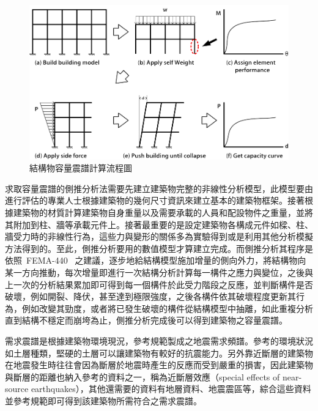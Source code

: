 \begin{figure}[hbtp]
  \begin{center}
    \includegraphics[width=1.0\textwidth]{figures/capacity-curve.png}
    \caption{結構物容量震譜計算流程圖}
    \label{fig:capacity-curve}
  \end{center}
\end{figure}

求取容量震譜的側推分析法需要先建立建築物完整的非線性分析模型，此模型要由進行評估的專業人士根據建築物的幾何尺寸資訊來建立基本的建築物框架。接著根據建築物的材質計算建築物自身重量以及需要承載的人員和配設物件之重量，並將其附加到柱、牆等承載元件上。接著最重要的是設定建築物各構成元件如樑、柱、牆受力時的非線性行為，這些力與變形的關係多為實驗得到或是利用其他分析模擬方法得到的。至此，側推分析要用的數值模型才算建立完成。而側推分析其程序是依照~FEMA-440\cite{fema440}~
之建議，逐步地給結構模型施加增量的側向外力，將結構物向某一方向推動，每次增量即進行一次結構分析計算每一構件之應力與變位，之後與上一次的分析結果累加即可得到每一個構件於此受力階段之反應，並判斷構件是否破壞，例如開裂、降伏，甚至達到極限強度，之後各構件依其破壞程度更新其行為，例如改變其勁度，或者將已發生破壞的構件從結構模型中抽離，如此重複分析直到結構不穩定而崩垮為止，側推分析完成後可以得到建築物之容量震譜。

需求震譜是根據建築物環境現況，參考規範製成之地震需求頻譜。參考的環境狀況如土層種類，堅硬的土層可以讓建築物有較好的抗震能力。另外靠近斷層的建築物在地震發生時往往會因為斷層於地震時產生的反應而受到嚴重的損害，因此建築物與斷層的距離也納入參考的資料之一，稱為近斷層效應（special effects of near-source earthquakes），其他還需要的資料有地層資料、地震震區等，綜合這些資料並參考規範即可得到該建築物所需符合之需求震譜。

